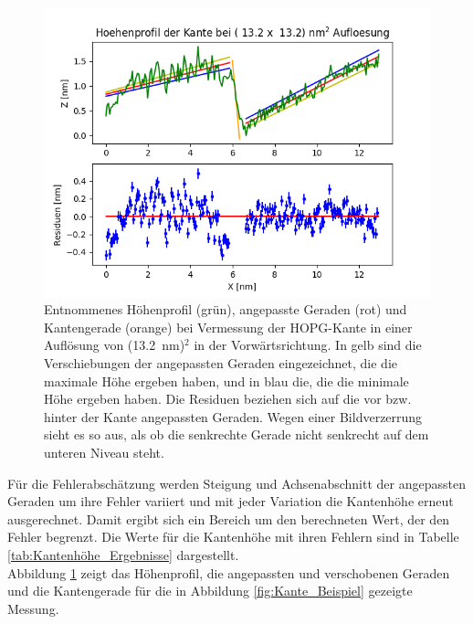 \documentclass[12pt,a4paper]{article}
\begin{document}
\begin{figure}
\centering
\includegraphics[scale=0.6]{Bilder/Anhang/Kante/Profil_Kante_0132_vor.png}
\caption{Entnommenes Höhenprofil (grün), angepasste Geraden (rot) und Kantengerade (orange) bei Vermessung der HOPG-Kante in einer Auflösung von (\SI{13,2}{nm})$^2$ in der Vorwärtsrichtung. In gelb sind die Verschiebungen der angepassten Geraden eingezeichnet, die die maximale Höhe ergeben haben, und in blau die, die die minimale Höhe ergeben haben. Die Residuen beziehen sich auf die vor bzw. hinter der Kante angepassten Geraden. Wegen einer Bildverzerrung sieht es so aus, als ob die senkrechte Gerade nicht senkrecht auf dem unteren Niveau steht.}
\label{fig:Kante_Hoehenprofil_Beispiel}
\end{figure}

Für die Fehlerabschätzung werden Steigung und Achsenabschnitt der angepassten Geraden  um ihre Fehler variiert und mit jeder Variation die Kantenhöhe erneut ausgerechnet. Damit ergibt sich ein Bereich um den berechneten Wert, der den Fehler begrenzt. Die Werte für die Kantenhöhe mit ihren Fehlern sind in Tabelle \ref{tab:Kantenhöhe_Ergebnisse} dargestellt.\\
Abbildung \ref{fig:Kante_Hoehenprofil_Beispiel} zeigt das Höhenprofil, die angepassten und verschobenen Geraden und die Kantengerade für die in Abbildung \ref{fig:Kante_Beispiel} gezeigte Messung.\\
\end{document}
